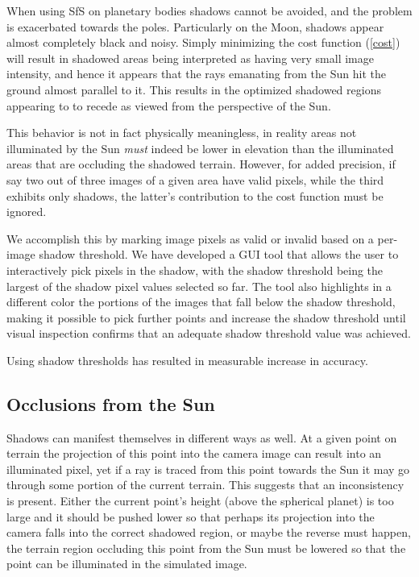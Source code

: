 \documentclass[12pt,oneside]{article}
\begin{document}
When using SfS on planetary bodies shadows cannot be avoided, and the
problem is exacerbated towards the poles. Particularly on the Moon,
shadows appear almost completely black and noisy. Simply minimizing the
cost function (\ref{cost}) will result in shadowed areas being
interpreted as having very small image intensity, and hence it appears
that the rays emanating from the Sun hit the ground almost parallel to
it. This results in the optimized shadowed regions appearing to to
recede as viewed from the perspective of the Sun.

This behavior is not in fact physically meaningless, in reality areas
not illuminated by the Sun \textit{must} indeed be lower in elevation
than the illuminated areas that are occluding the shadowed terrain.
However, for added precision, if say two out of three images of a given
area have valid pixels, while the third exhibits only shadows, the
latter's contribution to the cost function must be ignored.

We accomplish this by marking image pixels as valid or invalid based on
a per-image shadow threshold. We have developed a GUI tool that allows
the user to interactively pick pixels in the shadow, with the shadow
threshold being the largest of the shadow pixel values selected so
far. The tool also highlights in a different color the portions of the
images that fall below the shadow threshold, making it possible to pick
further points and increase the shadow threshold until visual inspection
confirms that an adequate shadow threshold value was achieved.

Using shadow thresholds has resulted in measurable increase in accuracy.

\subsection{Occlusions from the Sun}

Shadows can manifest themselves in different ways as well. At a given
point on terrain the projection of this point into the camera image can
result into an illuminated pixel, yet if a ray is traced from this point
towards the Sun it may go through some portion of the current
terrain. This suggests that an inconsistency is present. Either the
current point's height (above the spherical planet) is too large and it
should be pushed lower so that perhaps its projection into the camera
falls into the correct shadowed region, or maybe the reverse must
happen, the terrain region occluding this point from the Sun must be
lowered so that the point can be illuminated in the simulated image.
\end{document}
